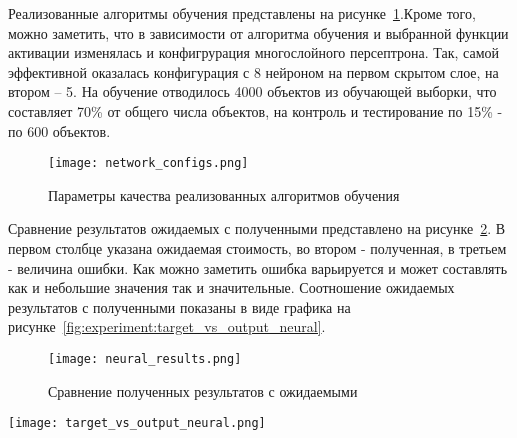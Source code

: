 Реализованные алгоритмы обучения представлены на рисунке~\ref{fig:experiment:network_configs}.\linebreak Кроме того, можно
заметить, что в зависимости от алгоритма обучения и выбранной функции активации изменялась и конфигрурация многослойного
персептрона. Так, самой эффективной оказалась конфигурация с 8 нейроном на первом скрытом слое, на втором – 5. На
обучение отводилось 4000 объектов из обучающей выборки, что составляет 70\% от общего числа объектов,
на контроль и тестирование по 15\% - по 600 объектов.

\begin{figure}[!ht]
  \centering
  \texttt{[image: network\_configs.png]}
  \caption{Параметры качества реализованных алгоритмов обучения}
  \label{fig:experiment:network_configs}
\end{figure}

Сравнение результатов ожидаемых с полученными представлено на рисунке~\ref{fig:experiment:neural_results}.
В первом столбце указана ожидаемая стоимость, во втором - полученная, в третьем - величина ошибки.
Как можно заметить ошибка варьируется и может составлять как и небольшие значения так и значительные.
Соотношение ожидаемых результатов с полученными показаны в виде графика на рисунке~\ref{fig:experiment:target_vs_output_neural}.

\begin{figure}[!ht]
  \centering
  \texttt{[image: neural\_results.png]}
  \caption{Сравнение полученных результатов с ожидаемыми}
  \label{fig:experiment:neural_results}
\end{figure}

\begin{sidewaysfigure}
  \centering
  \texttt{[image: target\_vs\_output\_neural.png]}
  \caption{Соотношение полученных результатов с ожидаемыми}
  \label{fig:experiment:target_vs_output_neural}
\end{sidewaysfigure}


